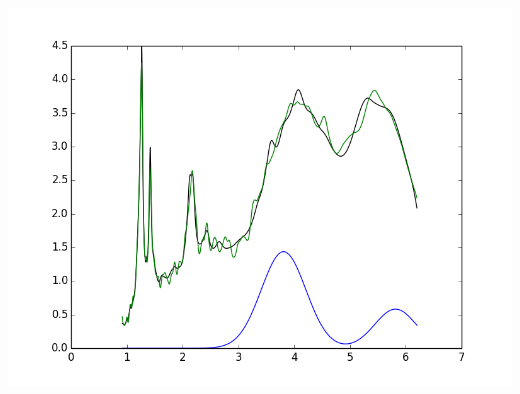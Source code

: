 \documentclass{article}
\begin{document}
\includegraphics{"normSep298-10-5SDS-1xdil.asc.png"}
\end{document}
